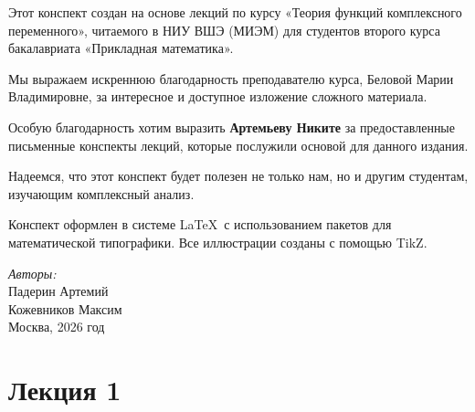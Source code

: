 	\begin{flushleft}
		\setlength{\parindent}{0pt}
		\setlength{\parskip}{1.2em}
		{\fontsize{14}{16}\selectfont
			Этот конспект создан на основе лекций по курсу «Теория функций комплексного переменного», читаемого в НИУ ВШЭ (МИЭМ) для студентов второго курса бакалавриата «Прикладная математика».
			
			Мы выражаем искреннюю благодарность преподавателю курса, Беловой Марии Владимировне, за интересное и доступное изложение сложного материала.
			
			Особую благодарность хотим выразить \textbf{Артемьеву Никите} за предоставленные письменные конспекты лекций, которые послужили основой для данного издания.
			
			Надеемся, что этот конспект будет полезен не только нам, но и другим студентам, изучающим комплексный анализ.
			
			Конспект оформлен в системе \LaTeX\ с использованием пакетов для математической типографики. Все иллюстрации созданы с помощью TikZ.
		}
		\vspace{1.5cm}
		\begin{flushright}
			{\fontsize{12}{14}\selectfont \emph{Авторы:}}\\[0.2cm]
			{\fontsize{12}{14}\selectfont Падерин Артемий}\\[0.1cm]
			{\fontsize{12}{14}\selectfont Кожевников Максим}\\[0.5cm]
			{\fontsize{11}{13}\selectfont Москва, 2026 год}
		\end{flushright}
	\end{flushleft}
	\newpage
	\pagestyle{main}
	\tableofcontents
	\newpage
	\section{Лекция 1}
